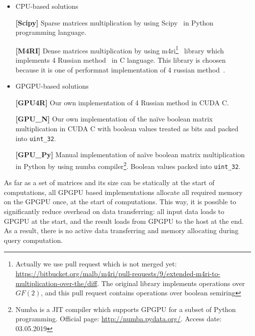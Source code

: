 \begin{itemize}
  \item CPU-based solutions

    \textbf{[Scipy]} Sparse matrices multiplication by using Scipy~\cite{scipy} in Python programming language.

    \textbf{[M4RI]} Dense matrices multiplication by using m4ri\footnote{Actually we use pull request which is not merged yet: \url{https://bitbucket.org/malb/m4ri/pull-requests/9/extended-m4ri-to-multiplication-over-the/diff}. The original library implements operations over $GF(2)$, and this pull request contains operations over boolean semiring}~\cite{M4RI} library which implements 4 Russian method~\cite{arlazarov1970economical} in C language.
    This library is choosen because it is one of performnat implementation of 4 russian method~\cite{albrechtefficient}.
  \item GPGPU-based solutions

    \textbf{[GPU4R]} Our own implementation of 4 Russian method in CUDA C.

    \textbf{[GPU\_N]} Our own implementation of the na\"ive boolean matrix multiplication in CUDA C with boolean values treated as bits and packed into \texttt{uint\_32}.

    \textbf{[GPU\_Py]} Manual implementation of na\"ive boolean matrix multiplication in Python by using numba compiler\footnote{Numba is a JIT compiler which supports GPGPU for a subset of Python programming. Official page: \url{http://numba.pydata.org/}. Access date: 03.05.2019}.
    Boolean values packed into \texttt{uint\_32}.

\end{itemize}

As far as a set of matrices and its size can be statically at the start of computations, all GPGPU based implementations allocate all required memory on the GPGPU once, at the start of computations.
This way, it is possible to significantly reduce overhead on data transferring: all input data loads to GPGPU at the start, and the result loads from GPGPU to the host at the end.
As a result, there is no active data transferring and memory allocating during query computation.
